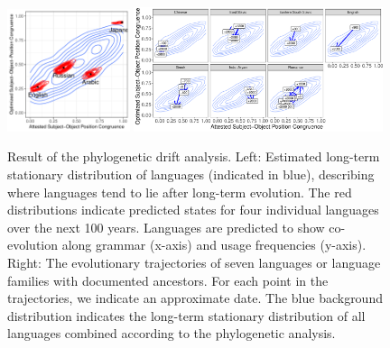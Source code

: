 \documentclass[9pt,twocolumn,twoside,lineno]{pnas-new}
\begin{document}
\begin{figure}
    \includegraphics[width=0.32\textwidth]{../change/visualize/stationary.pdf}
    \includegraphics[width=0.65\textwidth]{../analysis/figures/historical_2.6_times_stationary_layout.pdf}
    \caption{Result of the phylogenetic drift analysis.
	Left: Estimated long-term stationary distribution of languages (indicated in blue), describing where languages tend to lie after long-term evolution.
    The red distributions indicate predicted states for four individual languages over the next 100 years. Languages are predicted to show co-evolution along grammar (x-axis)  and usage frequencies (y-axis).	    
Right: The evolutionary trajectories of seven languages or language families with documented ancestors. For each point in the trajectories, we indicate an approximate date. The blue background distribution indicates the long-term stationary distribution of all languages combined according to the phylogenetic analysis. }
    \label{fig:historical}\label{fig:drift-model}
\end{figure}
\end{document}
